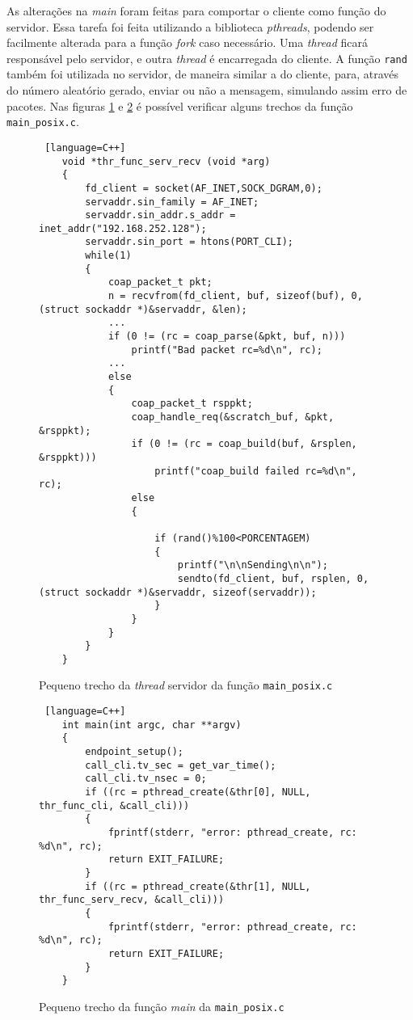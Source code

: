 As alterações na \textit{main} foram feitas para comportar o cliente como função do servidor. Essa tarefa foi feita utilizando a biblioteca \textit{pthreads}, podendo ser facilmente alterada para a função \textit{fork} caso necessário. Uma \textit{thread} ficará responsável pelo servidor, e outra \textit{thread} é encarregada do cliente. A função \texttt{rand} também foi utilizada no servidor, de maneira similar a do cliente, para, através do número aleatório gerado, enviar ou não a mensagem, simulando assim erro de pacotes. Nas figuras \ref{code:thread_serv_main_posix.c} e \ref{code:main_main_posic.c} é possível verificar alguns trechos da função \texttt{main\_posix.c}.

\begin{figure}[!htb]
	\begin{lstlisting} [language=C++]
	void *thr_func_serv_recv (void *arg)
	{
		fd_client = socket(AF_INET,SOCK_DGRAM,0);
		servaddr.sin_family = AF_INET;
		servaddr.sin_addr.s_addr = inet_addr("192.168.252.128");
		servaddr.sin_port = htons(PORT_CLI);
		while(1)
		{
			coap_packet_t pkt;
			n = recvfrom(fd_client, buf, sizeof(buf), 0, (struct sockaddr *)&servaddr, &len);
			...
			if (0 != (rc = coap_parse(&pkt, buf, n)))
				printf("Bad packet rc=%d\n", rc);
			...
			else
			{			
				coap_packet_t rsppkt;
				coap_handle_req(&scratch_buf, &pkt, &rsppkt);
				if (0 != (rc = coap_build(buf, &rsplen, &rsppkt)))
					printf("coap_build failed rc=%d\n", rc);
				else
				{
					
					if (rand()%100<PORCENTAGEM)
					{
						printf("\n\nSending\n\n");
						sendto(fd_client, buf, rsplen, 0, (struct sockaddr *)&servaddr, sizeof(servaddr));
					}
				}
			}
		}
	}
	\end{lstlisting}
	\caption{Pequeno trecho da \textit{thread} servidor da função \texttt{main\_posix.c}}
	\label{code:thread_serv_main_posix.c}
\end{figure}


\begin{figure}[!htb]
	\begin{lstlisting} [language=C++]
	int main(int argc, char **argv)
	{
		endpoint_setup();
		call_cli.tv_sec = get_var_time();
		call_cli.tv_nsec = 0;
		if ((rc = pthread_create(&thr[0], NULL, thr_func_cli, &call_cli)))
		{
			fprintf(stderr, "error: pthread_create, rc: %d\n", rc);
			return EXIT_FAILURE;
		}
		if ((rc = pthread_create(&thr[1], NULL, thr_func_serv_recv, &call_cli)))
		{
			fprintf(stderr, "error: pthread_create, rc: %d\n", rc);
			return EXIT_FAILURE;
		}
	}
	\end{lstlisting}
	\caption{Pequeno trecho da função \textit{main} da \texttt{main\_posix.c}}
	\label{code:main_main_posic.c}
\end{figure}

